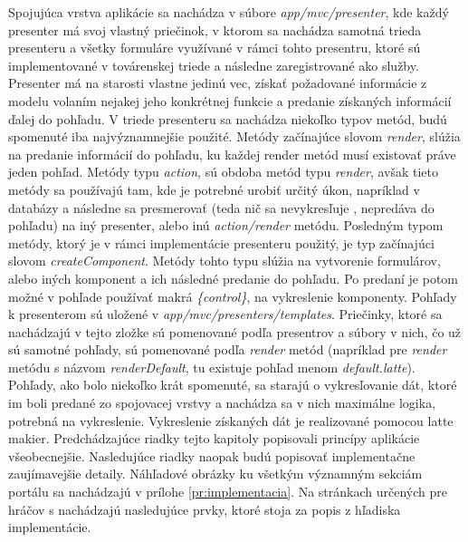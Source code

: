 Spojujúca vrstva aplikácie sa nachádza v súbore \textit{app/mvc/presenter}, kde každý presenter má svoj vlastný priečinok, v ktorom sa nachádza samotná trieda presenteru a všetky formuláre využívané v rámci tohto presentru, ktoré sú implementované v továrenskej triede a následne zaregistrované ako služby. Presenter má na starosti vlastne jedinú vec, získať požadované informácie z modelu volaním nejakej jeho konkrétnej funkcie a predanie získaných informácií ďalej do pohľadu. V triede presenteru sa nachádza niekoľko typov metód, budú spomenuté iba najvýznamnejšie použité. Metódy začínajúce slovom \textit{render}, slúžia na predanie informácií do pohľadu, ku každej render metód musí existovať práve jeden pohľad. Metódy typu \textit{action}, sú obdoba metód typu \textit{render}, avšak tieto metódy sa používajú tam, kde je potrebné urobiť určitý úkon, napríklad v databázy a následne sa presmerovať (teda nič sa nevykresľuje , nepredáva do pohľadu) na iný presenter, alebo inú \textit{action/render} metódu. Posledným typom metódy, ktorý je v rámci implementácie presenteru použitý, je typ začínajúci slovom \textit{createComponent}. Metódy tohto typu slúžia na vytvorenie formulárov, alebo iných komponent a ich následné predanie do pohľadu. Po predaní je potom možné v pohľade používať makrá \textit{\{control\}}, na vykreslenie komponenty. 
Pohľady k presenterom sú uložené v \textit{app/mvc/presenters/templates}. Priečinky, ktoré sa nachádzajú v tejto zložke sú pomenované podľa presentrov a súbory v nich, čo už sú samotné pohľady, sú pomenované podľa \textit{render} metód (napríklad pre \textit{render} metódu s názvom \textit{renderDefault}, tu existuje pohľad menom \textit{default.latte}). Pohľady, ako bolo niekoľko krát spomenuté, sa starajú o vykresľovanie dát, ktoré im boli predané zo spojovacej vrstvy a nachádza sa v nich maximálne logika, potrebná na vykreslenie. Vykreslenie získaných dát je realizované pomocou latte makier. 
Predchádzajúce riadky tejto kapitoly popisovali princípy aplikácie všeobecnejšie. Nasledujúce riadky naopak budú popisovať implementačne zaujímavejšie detaily. Náhľadové obrázky ku všetkým významným sekciám portálu sa nachádzajú v prílohe \ref{pr:implementacia}. Na stránkach určených pre hráčov s nachádzajú nasledujúce prvky, ktoré stoja za popis z hľadiska implementácie.
